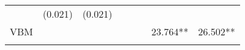 \documentclass[12pt,twoside]{reedthesis}
\begin{document}
\begin{longtable}[]{@{}lccccccc@{}}
\begin{minipage}[t]{0.10\columnwidth}
  \strut
  \end{minipage} & \begin{minipage}[t]{0.10\columnwidth}\centering\strut
  (0.021)\strut
  \end{minipage} & \begin{minipage}[t]{0.10\columnwidth}\centering\strut
  (0.021)\strut
  \end{minipage}\tabularnewline
  \begin{minipage}[t]{0.12\columnwidth}\raggedright\strut
  VBM\strut
  \end{minipage} & \begin{minipage}[t]{0.09\columnwidth}\centering\strut
  \strut
  \end{minipage} & \begin{minipage}[t]{0.10\columnwidth}\centering\strut
  \strut
  \end{minipage} & \begin{minipage}[t]{0.10\columnwidth}\centering\strut
  \strut
  \end{minipage} & \begin{minipage}[t]{0.10\columnwidth}\centering\strut
  \strut
  \end{minipage} & \begin{minipage}[t]{0.10\columnwidth}\centering\strut
  \strut
  \end{minipage} & \begin{minipage}[t]{0.10\columnwidth}\centering\strut
  23.764**\strut
  \end{minipage} & \begin{minipage}[t]{0.10\columnwidth}\centering\strut
  26.502**\strut
  \end{minipage}\tabularnewline
  \begin{minipage}[t]{0.12\columnwidth}\raggedright\strut
  \strut
  \end{minipage} & \begin{minipage}[t]{0.09\columnwidth}\centering\strut
  \strut
  \end{minipage} & \begin{minipage}[t]{0.10\columnwidth}\centering\strut
  \strut
  \end{minipage} & \begin{minipage}[t]{0.10\columnwidth}\centering\strut
  \strut
  \end{minipage} & \begin{minipage}[t]{0.10\columnwidth}\centering\strut
  \strut
  \end{minipage} & \begin{minipage}[t]{0.10\columnwidth}\centering\strut

\end{minipage}
\end{longtable}
\end{document}
